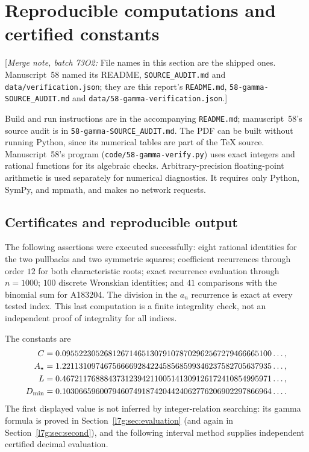 \documentclass[11pt,letterpaper]{article}
\newcommand{\file}[1]{\nolinkurl{#1}}
\theoremstyle{remark}\newtheorem{remark}[theorem]{Remark}
\newcommand{\mergenote}[1]{\textup{[}\emph{Merge note, batch 73O2:} #1\textup{]}}
\newcounter{l7gtrsavedeq}
\begin{document}
\section{Reproducible computations and certified constants}\label{l7g:sec:computations}

\mergenote{File names in this section are the shipped ones. Manuscript~58
named its README, \file{SOURCE_AUDIT.md} and
\file{data/verification.json}; they are this report's
\file{README.md}, \file{58-gamma-SOURCE_AUDIT.md} and
\file{data/58-gamma-verification.json}.}

Build and run instructions are in the accompanying \file{README.md};
manuscript~58's source audit is in \file{58-gamma-SOURCE_AUDIT.md}. The
PDF can be built without running Python, since its numerical tables are
part of the TeX source. Manuscript~58's program
(\file{code/58-gamma-verify.py}) uses exact integers and rational
functions for its algebraic checks. Arbitrary-precision floating-point
arithmetic is used separately for numerical diagnostics. It requires only
Python, SymPy, and mpmath, and makes no network requests.

\subsection{Certificates and reproducible output}

The following assertions were executed successfully: eight rational
identities for the two pullbacks and two symmetric squares; coefficient
recurrences through order $12$ for both characteristic roots; exact
recurrence evaluation through $n=1000$; $100$ discrete Wronskian
identities; and $41$ comparisons with the binomial sum for A183204.
The division in the $a_n$ recurrence is exact at every tested index.
This last computation is a finite integrality check, not an independent
proof of integrality for all indices.

The constants are
\begin{align*}
 C&=0.09552230526812671465130791078702962567279466665100\ldots,\\
 A_\star&=1.22113109746756666928422458568599346237582705637935\ldots,\\
 L&=0.46721176888437312394211005141309126172410854995971\ldots,\\
 D_{\min}&=0.10306659600794607491874204424062776206902297866964\ldots.
\end{align*}
The first displayed value is not inferred by integer-relation searching:
its gamma formula is proved in Section~\ref{l7g:sec:evaluation} (and again
in Section~\ref{l7g:sec:second}), and the following interval method
supplies independent certified decimal evaluation.
\end{document}
